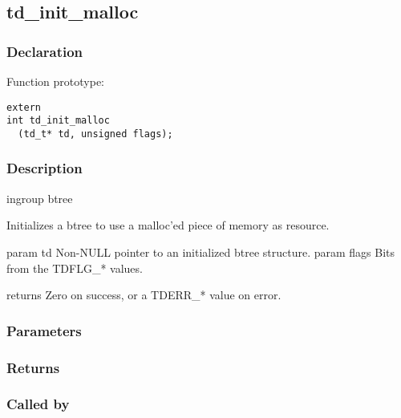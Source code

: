 
\newpage
\subsection{td\_init\_malloc}
\subsubsection{Declaration} Function prototype:

\begin{verbatim}
extern
int td_init_malloc
  (td_t* td, unsigned flags);
\end{verbatim}

\subsubsection{Description}


 ingroup btree

 Initializes a btree to use a malloc'ed piece of memory as resource.

 param td Non-NULL pointer to an initialized btree structure.
 param flags Bits from the TDFLG\_* values.

 returns Zero on success, or a TDERR\_* value on error.
 

\subsubsection{Parameters}
\subsubsection{Returns}
\subsubsection{Called by}
